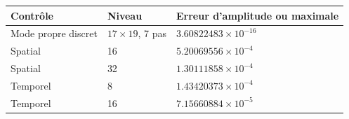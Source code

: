 \begin{tabular}{lll}
\toprule
Contrôle & Niveau & Erreur d'amplitude ou maximale \\
\midrule
Mode propre discret & $17\times19$, 7 pas & $3.60822483\times10^{-16}$ \\
Spatial & 16 & $5.20069556\times10^{-4}$ \\
Spatial & 32 & $1.30111858\times10^{-4}$ \\
Temporel & 8 & $1.43420373\times10^{-4}$ \\
Temporel & 16 & $7.15660884\times10^{-5}$ \\
\bottomrule
\end{tabular}
